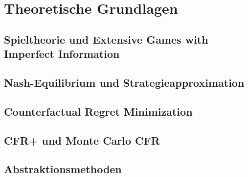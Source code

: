 \chapter{Theoretische Grundlagen}

\section{Spieltheorie und Extensive Games with Imperfect Information}

\section{Nash-Equilibrium und Strategieapproximation}

\section{Counterfactual Regret Minimization}

\section{CFR+ und Monte Carlo CFR}

\section{Abstraktionsmethoden}


